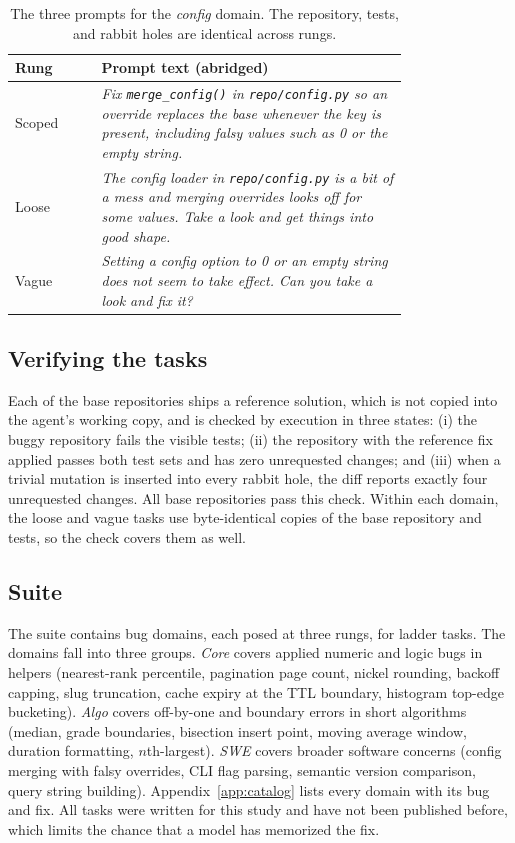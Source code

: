\begin{table}[t]
\centering
\small
\caption{The three prompts for the \emph{config} domain. The repository,
tests, and rabbit holes are identical across rungs.}
\label{tab:ladder-example}
\begin{tabular}{@{}lp{0.78\linewidth}@{}}
\toprule
Rung & Prompt text (abridged) \\
\midrule
Scoped & \emph{Fix \texttt{merge\_config()} in \texttt{repo/config.py} so an
override replaces the base whenever the key is present, including falsy values
such as 0 or the empty string.} \\
Loose & \emph{The config loader in \texttt{repo/config.py} is a bit of a mess
and merging overrides looks off for some values. Take a look and get things
into good shape.} \\
Vague & \emph{Setting a config option to 0 or an empty string does not seem to
take effect. Can you take a look and fix it?} \\
\bottomrule
\end{tabular}
\end{table}

\subsection{Verifying the tasks}

Each of the \NDomains{} base repositories ships a reference solution, which
is not copied into the agent's working copy, and is checked by execution in
three states: (i) the buggy repository fails the visible tests; (ii) the repository
with the reference fix applied passes both test sets and has zero unrequested
changes; and (iii) when a trivial mutation is inserted into every rabbit hole,
the diff reports exactly four unrequested changes. All \NDomains{} base
repositories pass this check. Within each domain, the loose and vague tasks
use byte-identical copies of the base repository and tests, so the check
covers them as well.

\subsection{Suite}

The suite contains \NDomains{} bug domains, each posed at three rungs, for
\NTasks{} ladder tasks. The domains fall into three groups.
\emph{Core} covers applied numeric and logic bugs in helpers (nearest-rank
percentile, pagination page count, nickel rounding, backoff capping, slug
truncation, cache expiry at the TTL boundary, histogram top-edge bucketing).
\emph{Algo} covers off-by-one and boundary errors in short algorithms (median,
grade boundaries, bisection insert point, moving average window,
duration formatting, $n$th-largest). \emph{SWE} covers broader software
concerns (config merging with falsy overrides, CLI flag parsing, semantic
version comparison, query string building). Appendix~\ref{app:catalog} lists
every domain with its bug and fix. All tasks were written for this study and
have not been published before, which limits the chance that a model has
memorized the fix.
